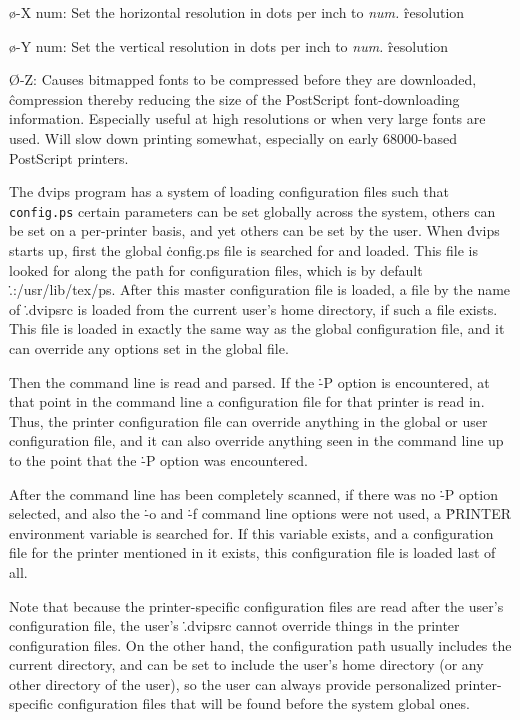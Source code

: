{\o-X num:
Set the horizontal resolution in dots per inch to {\it num.}
\^{resolution}

\o-Y num:
Set the vertical resolution in dots per inch to {\it num.}
\^{resolution}

\O-Z:
Causes bitmapped fonts to be compressed before they are downloaded,
\^{compression}
thereby reducing the size of the PostScript font-downloading information.
Especially useful at high resolutions or when very large fonts are
used.  Will slow down printing somewhat, especially on early 68000-based
PostScript printers.\par}


The \.{dvips} program has a system of loading configuration files such that
\^{{\tt config.ps}}
certain parameters can be set globally across the system, others can be set
on a
per-printer basis, and yet others can be set by the user.  When \.{dvips}
starts up, first the global \.{config.ps} file is searched for and loaded.
This file is looked for along the path for configuration files, which is by
default \.{.:/usr/lib/tex/ps}.
After this master configuration file is loaded, a file by the name of
\.{.dvipsrc} is loaded from the current user's home directory, if such
a file exists.  This file is loaded in exactly the same way as the global
configuration file, and it can override any options set in the global
file.

Then the command line is read and parsed.  If the \.{-P} option is
encountered, at that point in the command line a configuration file
for that printer is read in.  Thus, the printer configuration file can
override anything in the global or user configuration file, and it can
also override anything seen in the command line up to the point that the
\.{-P} option was encountered.

After the command line has been completely scanned, if there was no
\.{-P} option selected, and also the \.{-o} and \.{-f} command line
options were not used, a \.{PRINTER} environment variable is
searched for.  If this variable exists, and a configuration file for
the printer mentioned in it exists, this configuration file is
loaded last of all.

Note that because the printer-specific configuration files are read
after the user's configuration file, the user's \.{.dvipsrc}
cannot override things in
the printer configuration files.  On the other hand, the configuration path
usually includes the current directory, and can be set to include the
user's home directory (or any other directory of the user), so the user can
always provide personalized printer-specific configuration files that will
be found before the system global ones.

